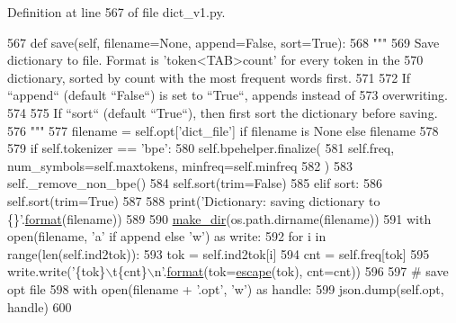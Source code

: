 Definition at line 567 of file dict\+\_\+v1.\+py.


\begin{DoxyCode}
567     \textcolor{keyword}{def }save(self, filename=None, append=False, sort=True):
568         \textcolor{stringliteral}{"""}
569 \textcolor{stringliteral}{        Save dictionary to file. Format is 'token<TAB>count' for every token in the}
570 \textcolor{stringliteral}{        dictionary, sorted by count with the most frequent words first.}
571 \textcolor{stringliteral}{}
572 \textcolor{stringliteral}{        If ``append`` (default ``False``) is set to ``True``, appends instead of}
573 \textcolor{stringliteral}{        overwriting.}
574 \textcolor{stringliteral}{}
575 \textcolor{stringliteral}{        If ``sort`` (default ``True``), then first sort the dictionary before saving.}
576 \textcolor{stringliteral}{        """}
577         filename = self.opt[\textcolor{stringliteral}{'dict\_file'}] \textcolor{keywordflow}{if} filename \textcolor{keywordflow}{is} \textcolor{keywordtype}{None} \textcolor{keywordflow}{else} filename
578 
579         \textcolor{keywordflow}{if} self.tokenizer == \textcolor{stringliteral}{'bpe'}:
580             self.bpehelper.finalize(
581                 self.freq, num\_symbols=self.maxtokens, minfreq=self.minfreq
582             )
583             self.\_remove\_non\_bpe()
584             self.sort(trim=\textcolor{keyword}{False})
585         \textcolor{keywordflow}{elif} sort:
586             self.sort(trim=\textcolor{keyword}{True})
587 
588         print(\textcolor{stringliteral}{'Dictionary: saving dictionary to \{\}'}.\hyperlink{namespaceparlai_1_1chat__service_1_1services_1_1messenger_1_1shared__utils_a32e2e2022b824fbaf80c747160b52a76}{format}(filename))
589 
590         \hyperlink{namespaceparlai_1_1core_1_1build__data_a6ce042fedd4194bd016845bbe7a8facf}{make\_dir}(os.path.dirname(filename))
591         with open(filename, \textcolor{stringliteral}{'a'} \textcolor{keywordflow}{if} append \textcolor{keywordflow}{else} \textcolor{stringliteral}{'w'}) \textcolor{keyword}{as} write:
592             \textcolor{keywordflow}{for} i \textcolor{keywordflow}{in} range(len(self.ind2tok)):
593                 tok = self.ind2tok[i]
594                 cnt = self.freq[tok]
595                 write.write(\textcolor{stringliteral}{'\{tok\}\(\backslash\)t\{cnt\}\(\backslash\)n'}.\hyperlink{namespaceparlai_1_1chat__service_1_1services_1_1messenger_1_1shared__utils_a32e2e2022b824fbaf80c747160b52a76}{format}(tok=\hyperlink{namespaceparlai_1_1agents_1_1legacy__agents_1_1seq2seq_1_1dict__v1_a780f6055b01f2cffa03c670159317ee0}{escape}(tok), cnt=cnt))
596 
597         \textcolor{comment}{# save opt file}
598         with open(filename + \textcolor{stringliteral}{'.opt'}, \textcolor{stringliteral}{'w'}) \textcolor{keyword}{as} handle:
599             json.dump(self.opt, handle)
600 
\end{DoxyCode}
